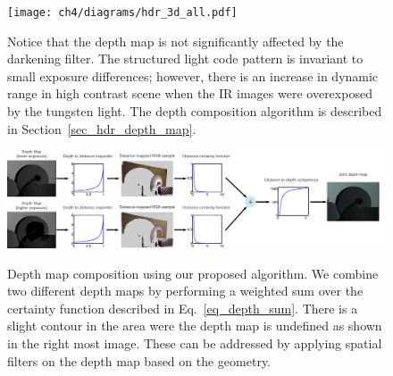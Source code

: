\begin{figure}
\centering
\texttt{[image: ch4/diagrams/hdr\_3d\_all.pdf]} 
\caption{Notice that the depth map is not significantly affected by the darkening filter. The 
structured light code pattern is invariant to small exposure differences; however, there is an 
increase in dynamic range in high contrast scene when the IR images were overexposed by the 
tungsten light. The depth composition algorithm is described in Section~\ref{sec_hdr_depth_map}.}

\label{fig_all_camera}
\end{figure}
\begin{figure}
\centering
\includegraphics[width=7in]{ch4/diagrams/jason_hdr.pdf} 
\label{fig_jason_dep_hdr}
\caption{Depth map composition using our proposed algorithm. We combine two different depth 
maps by performing a weighted sum over the certainty function described in 
Eq.~\ref{eq_depth_sum}. There is a slight contour in the area were the depth map is undefined as 
shown in the right most image. These can be addressed by applying spatial filters on the depth 
map based on the geometry.}
\end{figure}
